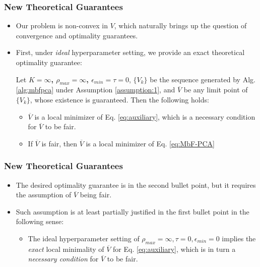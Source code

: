 \documentclass{beamer}
\begin{document}
\begin{frame}
	\frametitle{New Theoretical Guarantees}
	\begin{itemize}
		\item Our problem is non-convex in $V$, which naturally brings up the question of convergence and optimality guarantees.
		
		\item First, under {\it ideal} hyperparameter setting, we provide an exact theoretical optimality guarantee:
		\begin{theorem}
			\label{thm:mbfpca}
			Let {\color{red}\bf $K = \infty$, $\rho_{max} = \infty$, $\epsilon_{min} = \tau = 0$}, $\{V_k\}$ be the sequence generated by Alg. \ref{alg:mbfpca} under Assumption \ref{assumption:1}, and  $\overline{V}$ be any limit point of $\{V_k\}$, whose existence is guaranteed. Then the following holds:
			\begin{itemize}
				\item $\overline{V}$ is a local minimizer of Eq. \eqref{eq:auxiliary}, which is a {\color{blue} necessary condition for $\overline{V}$ to be fair}.
				
				\item {\color{blue} If $\overline{V}$ is fair}, then {$\overline{V}$ is a local minimizer of Eq. \eqref{eq:MbF-PCA}}
			\end{itemize}
		\end{theorem}
	\end{itemize}
\end{frame}

\begin{frame}
	\frametitle{New Theoretical Guarantees}
	\begin{itemize}
		\item The desired optimality guarantee is in the second bullet point, but it requires the assumption of $\overline{V}$ being fair.
		
		\item Such assumption is at least partially justified in the first bullet point in the following sense:
		\begin{itemize}
			\item The ideal hyperparameter setting of $\rho_{max} = \infty, \tau = 0, \epsilon_{min} = 0$ implies the {\it exact} local minimality of $\overline{V}$ for Eq. \eqref{eq:auxiliary}, which is in turn a {\it necessary condition} for $\overline{V}$ to be fair.
		\end{itemize}
	\end{itemize}
\end{frame}
\end{document}
